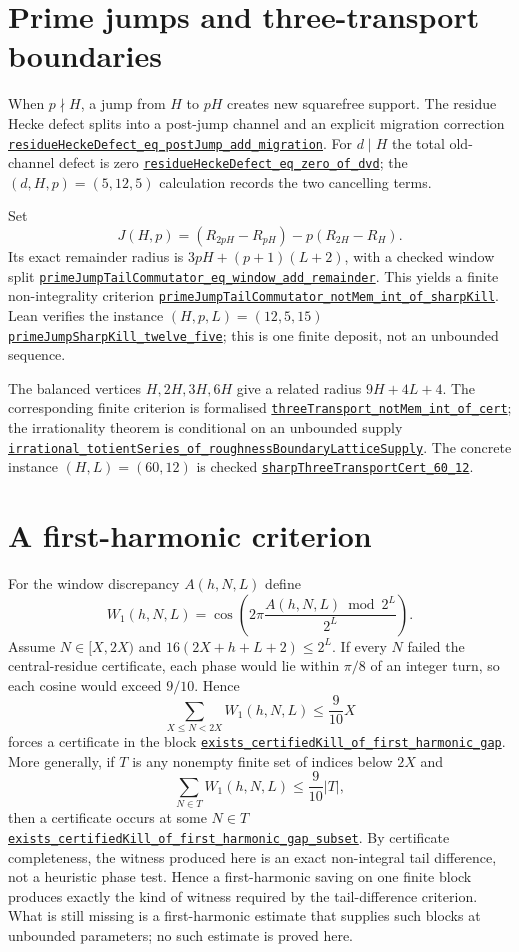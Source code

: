 \documentclass[11pt]{article}
\newcommand{\commit}{81150c1c6fdd4cd51e76d3aa0de344341e0e9e7c}
\newcommand{\repobase}{https://github.com/wcook04/plectis-lean-erdos249-257/blob/\commit}
\newcommand{\PK}{Erdos249257}
\newcommand{\lref}[3]{\href{\repobase/\PK/#1\#L#2}{\nolinkurl{#3}}}
\theoremstyle{remark}\newtheorem*{remark}{Remark}
\begin{document}
\section{Prime jumps and three-transport boundaries}\label{sec:primejump}
When $p\nmid H$, a jump from $H$ to $pH$ creates new squarefree support.  The
residue Hecke defect splits into a post-jump channel and an explicit migration
correction
\lref{PrimeJumpMigration.lean}{38}{residueHeckeDefect_eq_postJump_add_migration}.
For $d\mid H$ the total old-channel defect is zero
\lref{PrimeJumpMigration.lean}{46}{residueHeckeDefect_eq_zero_of_dvd}; the
$(d,H,p)=(5,12,5)$ calculation records the two cancelling terms.

Set
\[
 J(H,p)=(R_{2pH}-R_{pH})-p(R_{2H}-R_H).
\]
Its exact remainder radius is $3pH+(p+1)(L+2)$, with a checked window split
\lref{PrimeJumpWindow.lean}{91}{primeJumpTailCommutator_eq_window_add_remainder}.
This yields a finite non-integrality criterion
\lref{PrimeJumpWindow.lean}{178}{primeJumpTailCommutator_notMem_int_of_sharpKill}.
Lean verifies the instance $(H,p,L)=(12,5,15)$
\lref{PrimeJumpWindow.lean}{186}{primeJumpSharpKill_twelve_five}; this is one
finite deposit, not an unbounded sequence.

The balanced vertices $H,2H,3H,6H$ give a related radius $9H+4L+4$.
The corresponding finite criterion is formalised
\lref{ThreeTransportBoundary.lean}{126}{threeTransport_notMem_int_of_cert};
the irrationality theorem is conditional on an unbounded supply
\lref{ThreeTransportBoundary.lean}{177}{irrational_totientSeries_of_roughnessBoundaryLatticeSupply}.
The concrete instance $(H,L)=(60,12)$ is checked
\lref{ThreeTransportBoundary.lean}{203}{sharpThreeTransportCert_60_12}.

\section{A first-harmonic criterion}\label{sec:harmonic}
For the window discrepancy $A(h,N,L)$ define
\[
 W_1(h,N,L)=\cos\left(2\pi\frac{A(h,N,L)\bmod2^L}{2^L}\right).
\]
Assume $N\in[X,2X)$ and $16(2X+h+L+2)\le2^L$.  If every $N$ failed the
central-residue certificate, each phase would lie within $\pi/8$ of an
integer turn, so each cosine would exceed $9/10$.  Hence
\[
 \sum_{X\le N<2X}W_1(h,N,L)\le\frac9{10}X
\]
forces a certificate in the block
\lref{FirstHarmonicGap.lean}{128}{exists_certifiedKill_of_first_harmonic_gap}.
More generally, if $T$ is any nonempty finite set of indices below $2X$ and
\[
 \sum_{N\in T}W_1(h,N,L)\le\frac9{10}|T|,
\]
then a certificate occurs at some $N\in T$
\lref{FirstHarmonicGap.lean}{104}{exists_certifiedKill_of_first_harmonic_gap_subset}.
By certificate completeness, the witness produced here is an exact
non-integral tail difference, not a heuristic phase test.  Hence a
first-harmonic saving on one finite block produces exactly the kind of witness
required by the tail-difference criterion.  What is still missing is a
first-harmonic estimate that supplies such blocks at unbounded parameters; no
such estimate is proved here.
\end{document}
